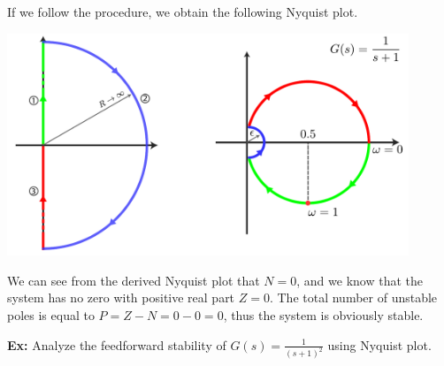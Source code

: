 \documentclass[twoside]{article}
\begin{document}
If we follow the procedure, we obtain the following Nyquist plot. 

\vspace{6 pt}

  \begin{minipage}[h]{1\linewidth}
    \begin{center}
      \includegraphics[width=0.9\textwidth]{ex2}
    \end{center}
  \end{minipage}

\vspace{6 pt}

We can see from the derived Nyquist plot that $N=0$, and 
we know that the system has no zero with positive real part 
$Z =0$. The total number of unstable poles is equal to
$P = Z - N = 0 - 0 = 0$, thus the system is obviously stable. 

\newpage

\textbf{Ex:} Analyze the feedforward stability of $G(s) =
\frac{1}{(s+1)^2}$ using Nyquist plot. 
\end{document}
